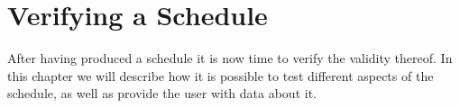 \chapter{Verifying a Schedule} \label{cha:cha2}
After having produced a schedule it is now time to verify the validity thereof.
In this chapter we will describe how it is possible to test different aspects of the schedule, as well as provide the user with data about it.




